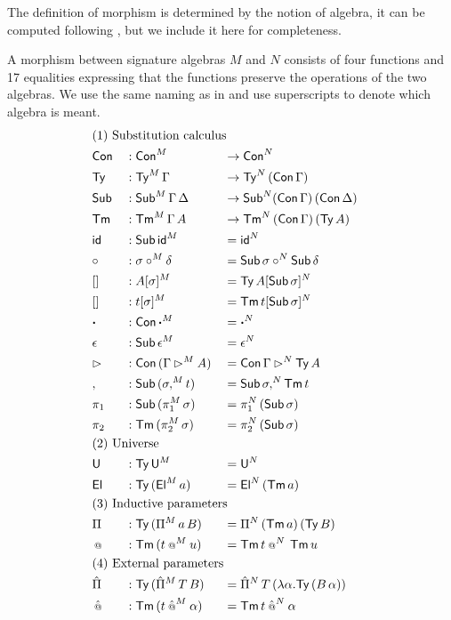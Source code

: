 \documentclass[a4paper,UKenglish,cleveref, autoref]{lipics-v2019}
\begin{document}
The definition of morphism is determined by the notion of algebra, it
can be computed following \cite{large_inf_qiit}, but we include it
here for completeness.
\begin{definition}\label{def:morphism}
  A morphism between signature algebras $M$ and $N$ consists of four
  functions and 17 equalities expressing that the functions preserve
  the operations of the two algebras. We use the same naming as in
   and use superscripts to denote which algebra is
  meant.
\begin{alignat*}{5}
  & \rlap{(1) Substitution calculus} \\
  & \Con && : \Con^M && \ra\Con^N \\
  & \Ty  && : \Ty^M\,\Gamma && \ra\Ty^N\,(\Con\,\Gamma) \\
  & \Sub  && : \Sub^M\,\Gamma\,\Delta && \ra\Sub^N(\Con\,\Gamma)\,(\Con\,\Delta) \\
  & \Tm  && : \Tm^M\,\Gamma\,A && \ra\Tm^N\,(\Con\,\Gamma)\,(\Ty\,A) \\
  & \id && : \Sub\,\id^M && = \id^N \\
  & {\circ} && : \sigma\circ^M\delta && = \Sub\,\sigma\circ^N\Sub\,\delta \\
  & [] && : A[\sigma]^M && = \Ty\,A[\Sub\,\sigma]^N \\
  & [] && : t[\sigma]^M && = \Tm\,t[\Sub\,\sigma]^N \\
  & \boldsymbol{\cdot} && : \Con\,\boldsymbol{\cdot}^M && = \boldsymbol{\cdot}^N \\
  & \epsilon && : \Sub\,\epsilon^M && = \epsilon^N \\
  & \ext && : \Con\,(\Gamma\ext^M A) && = \Con\,\Gamma\ext^N\Ty\,A \\
  & , && : \Sub\,(\sigma,^M t) && = \Sub\,\sigma ,^N\Tm\,t \\
  & \pi_1 && : \Sub\,(\pi_1^M\,\sigma) && = \pi_1^N\,(\Sub\,\sigma) \\
  & \pi_2 && : \Tm\,(\pi_2^M\,\sigma) && = \pi_2^N\,(\Sub\,\sigma) \\
  & \rlap{(2) Universe} \\
  & \U && : \Ty\,\U^M && = \U^N \\
  & \El && : \Ty\,(\El^M\,a) && = \El^N\,(\Tm\,a) \\
  & \rlap{(3) Inductive parameters} \\
  & \Pi && : \Ty\,(\Pi^M\,a\,B) && = \Pi^N\,(\Tm\,a)\,(\Ty\,B) \\
  & \oldapp && : \Tm\,(t\mathbin{{\oldapp}^M} u) && = \Tm\,t\mathbin{{\oldapp}^N}\,\Tm\,u \\
  & \rlap{(4) External parameters} \\
  & \Pim && : \Ty\,(\Pim^M\,T\,B) && = \Pim^N\,T\,(\lambda\alpha.\Ty\,(B\,\alpha)) \\
  & \appm && : \Tm\,(t\mathbin{{\appm}^M}\alpha) && = \Tm\,t\mathbin{{\appm}^N}\alpha
\end{alignat*}
\end{definition}
\end{document}

